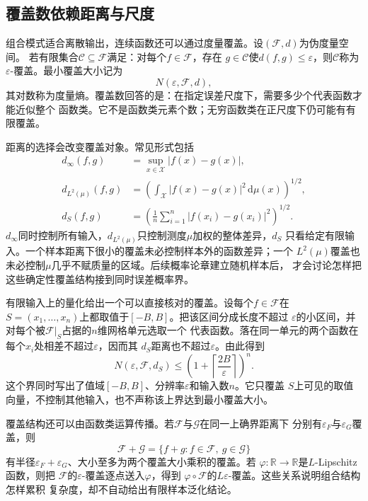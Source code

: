 \subsection{覆盖数依赖距离与尺度}

组合模式适合离散输出，连续函数还可以通过度量覆盖。设$(\mathcal{F},d)$为伪度量空间。
若有限集合$\mathcal{C}\subseteq\mathcal{F}$满足：对每个$f\in\mathcal{F}$，存在
$g\in\mathcal{C}$使$d(f,g)\leq\varepsilon$，则$\mathcal{C}$称为
$\varepsilon$-覆盖。最小覆盖大小记为
\[
  N(\varepsilon,\mathcal{F},d),
\]
其对数称为度量熵。覆盖数回答的是：在指定误差尺度下，需要多少个代表函数才能近似整个
函数类。它不是函数类元素个数；无穷函数类在正尺度下仍可能有有限覆盖。

距离的选择会改变覆盖对象。常见形式包括
\begin{align*}
  d_{\infty}(f,g)
  &=
  \sup_{x\in\mathcal{X}}|f(x)-g(x)|,\\
  d_{L^2(\mu)}(f,g)
  &=
  \left(
    \int_{\mathcal{X}}|f(x)-g(x)|^2\,\mathrm{d}\mu(x)
  \right)^{1/2},\\
  d_S(f,g)
  &=
  \left(
    \frac1n\sum_{i=1}^{n}|f(x_i)-g(x_i)|^2
  \right)^{1/2}.
\end{align*}
$d_\infty$同时控制所有输入，$d_{L^2(\mu)}$只控制测度$\mu$加权的整体差异，$d_S$
只看给定有限输入。一个样本距离下很小的覆盖未必控制样本外的函数差异；一个
$L^2(\mu)$覆盖也未必控制$\mu$几乎不赋质量的区域。后续概率论章建立随机样本后，
才会讨论怎样把这些确定性覆盖结构接到同时误差概率界。

有限输入上的量化给出一个可以直接核对的覆盖。设每个$f\in\mathcal{F}$在
$S=(x_1,\ldots,x_n)$上都取值于$[-B,B]$。把该区间分成长度不超过
$\varepsilon$的小区间，并对每个被$\mathcal{F}|_S$占据的$n$维网格单元选取一个
代表函数。落在同一单元的两个函数在每个$x_i$处相差不超过$\varepsilon$，因而其
$d_S$距离也不超过$\varepsilon$。由此得到
\[
  N(\varepsilon,\mathcal{F},d_S)
  \leq
  \left(1+\left\lceil\frac{2B}{\varepsilon}\right\rceil\right)^n.
\]
这个界同时写出了值域$[-B,B]$、分辨率$\varepsilon$和输入数$n$。它只覆盖
$S$上可见的取值向量，不控制其他输入，也不声称该上界达到最小覆盖大小。

覆盖结构还可以由函数类运算传播。若$\mathcal{F}$与$\mathcal{G}$在同一上确界距离下
分别有$\varepsilon_F$与$\varepsilon_G$覆盖，则
\[
  \mathcal{F}+\mathcal{G}
  =
  \{f+g:f\in\mathcal{F},\ g\in\mathcal{G}\}
\]
有半径$\varepsilon_F+\varepsilon_G$、大小至多为两个覆盖大小乘积的覆盖。若
$\varphi:\mathbb{R}\to\mathbb{R}$是$L$-Lipschitz函数，则把
$\mathcal{F}$的$\varepsilon$-覆盖逐点送入$\varphi$，得到
$\varphi\circ\mathcal{F}$的$L\varepsilon$-覆盖。这些关系说明组合结构怎样累积
复杂度，却不自动给出有限样本泛化结论。

